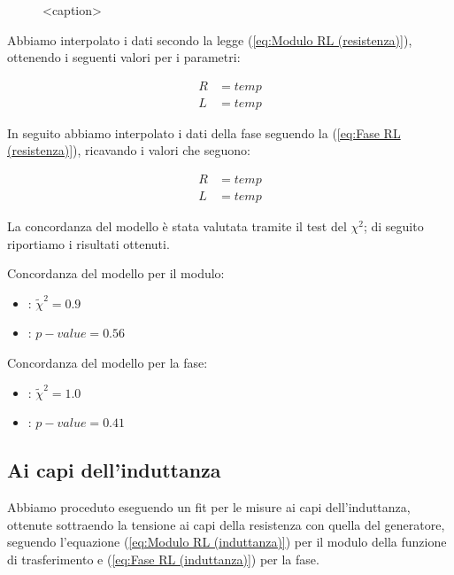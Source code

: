 \documentclass[letterpaper,12pt]{article}
\begin{document}

\begin{figure}[h!]
    \centering
    
    \caption{<caption>}
    \label{fig:grafici RL resistenza}
\end{figure}

Abbiamo interpolato i dati secondo la legge (\ref{eq:Modulo RL (resistenza)}), ottenendo i seguenti valori per i parametri:

\begin{align*} %
    R &= temp \\
    L &= temp
\end{align*}

In seguito abbiamo interpolato i dati della fase seguendo la (\ref{eq:Fase RL (resistenza)}), ricavando i valori che seguono:

\begin{align*} %
    R &= temp \\
    L &= temp
\end{align*}

La concordanza del modello è stata valutata tramite il test del $\chi^2$; di seguito riportiamo i risultati ottenuti.

Concordanza del modello per il modulo:
\begin{itemize} %
    \item: $\widetilde{\chi}^2 = 0.9$   
    \item: $p-value = 0.56$ 
\end{itemize}

Concordanza del modello per la fase:
\begin{itemize} 
    \item: $\widetilde{\chi}^2 = 1.0$   
    \item: $p-value = 0.41$
\end{itemize}

\subsection{Ai capi dell'induttanza}

Abbiamo proceduto eseguendo un fit per le misure ai capi dell'induttanza, ottenute sottraendo la tensione ai capi della resistenza con quella del generatore, seguendo l'equazione (\ref{eq:Modulo RL (induttanza)}) per il modulo della funzione di trasferimento e (\ref{eq:Fase RL (induttanza)}) per la fase.\\
\end{document}
